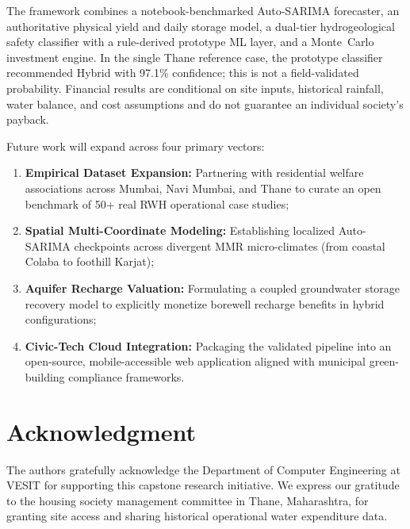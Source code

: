 ﻿\documentclass[conference]{IEEEtran}
\begin{document}
The framework combines a notebook-benchmarked Auto-SARIMA forecaster, an authoritative physical yield and daily storage model, a dual-tier hydrogeological safety classifier with a rule-derived prototype ML layer, and a Monte~Carlo investment engine. In the single Thane reference case, the prototype classifier recommended Hybrid with 97.1\% confidence; this is not a field-validated probability. Financial results are conditional on site inputs, historical rainfall, water balance, and cost assumptions and do not guarantee an individual society's payback.

Future work will expand across four primary vectors:
\begin{enumerate}
  \item \textbf{Empirical Dataset Expansion:} Partnering with residential welfare associations across Mumbai, Navi Mumbai, and Thane to curate an open benchmark of 50+ real RWH operational case studies;
  \item \textbf{Spatial Multi-Coordinate Modeling:} Establishing localized Auto-SARIMA checkpoints across divergent MMR micro-climates (from coastal Colaba to foothill Karjat);
  \item \textbf{Aquifer Recharge Valuation:} Formulating a coupled groundwater storage recovery model to explicitly monetize borewell recharge benefits in hybrid configurations;
  \item \textbf{Civic-Tech Cloud Integration:} Packaging the validated pipeline into an open-source, mobile-accessible web application aligned with municipal green-building compliance frameworks.
\end{enumerate}

\section*{Acknowledgment}
The authors gratefully acknowledge the Department of Computer Engineering at VESIT for supporting this capstone research initiative. We express our gratitude to the housing society management committee in Thane, Maharashtra, for granting site access and sharing historical operational water expenditure data.
\end{document}
